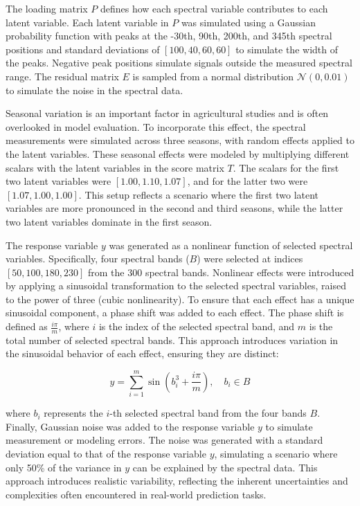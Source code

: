 The loading matrix $P$ defines how each spectral variable contributes to each latent variable. Each latent variable in $P$ was simulated using a Gaussian probability function with peaks at the -30th, 90th, 200th, and 345th spectral positions and standard deviations of $[100, 40, 60, 60]$ to simulate the width of the peaks. Negative peak positions simulate signals outside the measured spectral range. The residual matrix $E$ is sampled from a normal distribution $\mathcal{N}(0, 0.01)$ to simulate the noise in the spectral data. 

Seasonal variation is an important factor in agricultural studies and is often overlooked in model evaluation. To incorporate this effect, the spectral measurements were simulated across three seasons, with random effects applied to the latent variables. These seasonal effects were modeled by multiplying different scalars with the latent variables in the score matrix $T$. The scalars for the first two latent variables were $[1.00, 1.10, 1.07]$, and for the latter two were $[1.07, 1.00, 1.00]$. This setup reflects a scenario where the first two latent variables are more pronounced in the second and third seasons, while the latter two latent variables dominate in the first season.

The response variable $y$ was generated as a nonlinear function of selected spectral variables. Specifically, four spectral bands ($B$) were selected at indices $[50, 100, 180, 230]$ from the 300 spectral bands. Nonlinear effects were introduced by applying a sinusoidal transformation to the selected spectral variables, raised to the power of three (cubic nonlinearity). To ensure that each effect has a unique sinusoidal component, a phase shift was added to each effect. The phase shift is defined as $\frac{i \pi}{m}$, where $i$ is the index of the selected spectral band, and $m$ is the total number of selected spectral bands. This approach introduces variation in the sinusoidal behavior of each effect, ensuring they are distinct:

$$
y = \sum_{i=1}^{m}\sin(b^3_i + \frac{i \pi}{m}), \quad b_i \in B
$$

where $b_i$ represents the $i$-th selected spectral band from the four bands $B$. Finally, Gaussian noise was added to the response variable $y$ to simulate measurement or modeling errors. The noise was generated with a standard deviation equal to that of the response variable $y$, simulating a scenario where only 50\% of the variance in $y$ can be explained by the spectral data. This approach introduces realistic variability, reflecting the inherent uncertainties and complexities often encountered in real-world prediction tasks.


